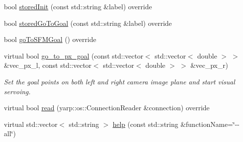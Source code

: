 \begin{DoxyCompactItemize}
\item 
bool \hyperlink{classVisualServoingServer_abf97ec3877e208f4e889a094298a1e1a}{stored\+Init} (const std\+::string \&label) override
\item 
bool \hyperlink{classVisualServoingServer_a6d6ec7fee5b76d8a59d75a626b1bd11b}{stored\+Go\+To\+Goal} (const std\+::string \&label) override
\item 
bool \hyperlink{classVisualServoingServer_a6d051da5da8c07b0e0879d5af50a248f}{go\+To\+S\+F\+M\+Goal} () override
\item 
virtual bool \hyperlink{classVisualServoingIDL_a75929f915651161c43ed032e9f69a361}{go\+\_\+to\+\_\+px\+\_\+goal} (const std\+::vector$<$ std\+::vector$<$ double $>$ $>$ \&vec\+\_\+px\+\_\+l, const std\+::vector$<$ std\+::vector$<$ double $>$ $>$ \&vec\+\_\+px\+\_\+r)
\begin{DoxyCompactList}\small\item\em Set the goal points on both left and right camera image plane and start visual servoing. \end{DoxyCompactList}\item 
virtual bool \hyperlink{classVisualServoingIDL_a97106bf829447896de03680d78b960a5}{read} (yarp\+::os\+::\+Connection\+Reader \&connection) override
\item 
virtual std\+::vector$<$ std\+::string $>$ \hyperlink{classVisualServoingIDL_a99974ef8858179f14e2762c2d7bf4ed5}{help} (const std\+::string \&function\+Name=\char`\"{}-\/-\/all\char`\"{})
\end{DoxyCompactItemize}
